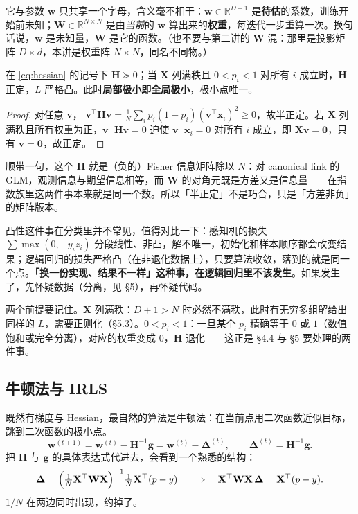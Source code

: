 \documentclass[11pt,a4paper,fontset=windows,zihao=-4]{ctexart}
\newcommand{\R}{\mathbb{R}}
\newcommand{\bX}{\mathbf{X}}
\newcommand{\bw}{\mathbf{w}}
\newcommand{\bx}{\mathbf{x}}
\newcommand{\bg}{\mathbf{g}}
\newcommand{\bv}{\mathbf{v}}
\newcommand{\bH}{\mathbf{H}}
\newcommand{\bW}{\mathbf{W}}
\newcommand{\bDelta}{\boldsymbol{\Delta}}
\newcommand{\bzero}{\mathbf{0}}
\newcommand{\tp}{^{\top}}
\begin{document}
它与参数 $\bw$ 只共享一个字母，含义毫不相干：$\bw\in\R^{D+1}$ 是\textbf{待估}的系数，训练开始前未知；$\bW\in\R^{N\times N}$ 是由\emph{当前}的 $\bw$ 算出来的\textbf{权重}，每迭代一步重算一次。换句话说，$\bw$ 是未知量，$\bW$ 是它的函数。（也不要与第二讲的 $\bW$ 混：那里是投影矩阵 $D\times d$，本讲是权重阵 $N\times N$，同名不同物。）

\begin{thm}[损失严格凸]
在 \eqref{eq:hessian} 的记号下 $\bH\succeq0$；当 $\bX$ 列满秩且 $0<p_i<1$ 对所有 $i$ 成立时，$\bH$ 正定，$L$ 严格凸。此时\textbf{局部极小即全局极小}，极小点唯一。
\end{thm}

\begin{proof}
对任意 $\bv$，
$\bv\tp\bH\bv=\frac1N\sum_i p_i(1-p_i)(\bv\tp\bx_i)^2\ge0$，故半正定。若 $\bX$ 列满秩且所有权重为正，$\bv\tp\bH\bv=0$ 迫使 $\bv\tp\bx_i=0$ 对所有 $i$ 成立，即 $\bX\bv=\bzero$，只有 $\bv=\bzero$，故正定。
\end{proof}

顺带一句，这个 $\bH$ 就是（负的）Fisher 信息矩阵除以 $N$：对 canonical link 的 GLM，观测信息与期望信息相等，而 $\bW$ 的对角元既是方差又是信息量——在指数族里这两件事本来就是同一个数。所以「半正定」不是巧合，只是「方差非负」的矩阵版本。

凸性这件事在分类里并不常见，值得对比一下：感知机的损失 $\sum\max(0,-y_i z_i)$ 分段线性、非凸，解不唯一，初始化和样本顺序都会改变结果；逻辑回归的损失严格凸（在非退化数据上），只要算法收敛，落到的就是同一个点。\textbf{「换一份实现、结果不一样」这种事，在逻辑回归里不该发生}。如果发生了，先怀疑数据（分离，见 \S5），再怀疑代码。

两个前提要记住。$\bX$ 列满秩：$D+1>N$ 时必然不满秩，此时有无穷多组解给出同样的 $L$，需要正则化（\S5.3）。$0<p_i<1$：一旦某个 $p_i$ 精确等于 $0$ 或 $1$（数值饱和或完全分离），对应的权重变成 $0$，$\bH$ 退化——这正是 \S4.4 与 \S5 要处理的两件事。

\subsection{牛顿法与 IRLS}

既然有梯度与 Hessian，最自然的算法是牛顿法：在当前点用二次函数近似目标，跳到二次函数的极小点。
\begin{equation}
  \bw^{(t+1)}=\bw^{(t)}-\bH^{-1}\bg
  =\bw^{(t)}-\bDelta^{(t)},
  \qquad \bDelta^{(t)}=\bH^{-1}\bg .
  \label{eq:newton}
\end{equation}
把 $\bH$ 与 $\bg$ 的具体表达式代进去，会看到一个熟悉的结构：
\begin{equation}
  \bDelta=\Bigl(\tfrac1N\bX\tp\bW\bX\Bigr)^{-1}\tfrac1N\bX\tp(p-y)
  \quad\Longrightarrow\quad
  \bX\tp\bW\bX\,\bDelta=\bX\tp(p-y).
  \label{eq:newtonstep}
\end{equation}
$1/N$ 在两边同时出现，约掉了。
\end{document}
